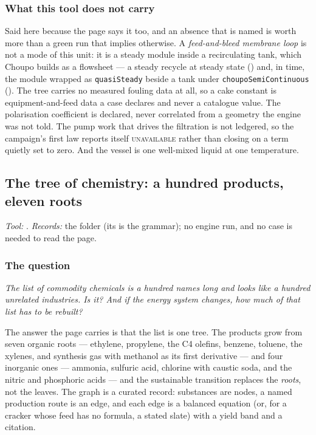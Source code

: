 \documentclass[11pt,a4paper]{article}
\begin{document}
\subsubsection*{What this tool does not carry}

Said here because the page says it too, and an absence that is named is
worth more than a green run that implies otherwise.  A
\emph{feed-and-bleed membrane loop} is not a mode of this unit: it is a
steady module inside a recirculating tank, which Choupo builds as a
flowsheet --- a steady recycle at steady state
() and, in time,
the module wrapped as \texttt{quasiSteady} beside a tank under
\texttt{choupoSemiContinuous}
().  The tree carries no
measured fouling data at all, so a cake constant is equipment-and-feed
data a case declares and never a catalogue value.  The polarisation
coefficient is declared, never correlated from a geometry the engine was
not told.  The pump work that drives the filtration is not ledgered, so
the campaign's first law reports itself \textsc{unavailable} rather than
closing on a term quietly set to zero.  And the vessel is one well-mixed
liquid at one temperature.

\subsection{The tree of chemistry: a hundred products, eleven roots}\label{sec:edu-tree-of-chemistry}


\noindent\textit{\small Tool:} .  \textit{\small
Records:} the folder  (its  is the
grammar); no engine run, and no case is needed to read the page.

\subsubsection*{The question}

\emph{The list of commodity chemicals is a hundred names long and looks
like a hundred unrelated industries.  Is it?  And if the energy system
changes, how much of that list has to be rebuilt?}

The answer the page carries is that the list is one tree.  The products
grow from seven organic roots --- ethylene, propylene, the C4 olefins,
benzene, toluene, the xylenes, and synthesis gas with methanol as its first
derivative --- and four inorganic ones --- ammonia, sulfuric acid,
chlorine with caustic soda, and the nitric and phosphoric acids --- and the
sustainable transition replaces the \emph{roots}, not the leaves.  The
graph is a curated record: substances are nodes, a named production route
is an edge, and each edge is a balanced equation (or, for a cracker whose
feed has no formula, a stated slate) with a yield band and a citation.
\end{document}
